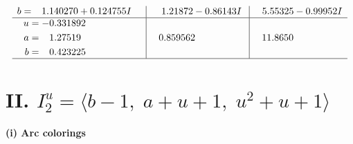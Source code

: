 \documentclass[1p]{elsarticle_modified}
\theoremstyle{definition}
\begin{document}
$$\begin{array}{c|c|c}
\begin{aligned}
b &= \phantom{-}1.140270 + 0.124755 I\end{aligned}
 & \phantom{-}1.21872 - 0.86143 I & \phantom{-}5.55325 - 0.99952 I \\ \hline\begin{aligned}
u &= -0.331892\phantom{ +0.000000I} \\
a &= \phantom{-}1.27519\phantom{ +0.000000I} \\
b &= \phantom{-}0.423225\phantom{ +0.000000I}\end{aligned}
 & \phantom{-}0.859562\phantom{ +0.000000I} & \phantom{-}11.8650\phantom{ +0.000000I}\\
 \hline 
 \end{array}$$\newpage\newpage\renewcommand{\arraystretch}{1}
\centering \section*{II. $I^u_{2}= \langle b-1,\;a+u+1,\;u^2+u+1 \rangle$}
\flushleft \textbf{(i) Arc colorings}\\
\end{document}
